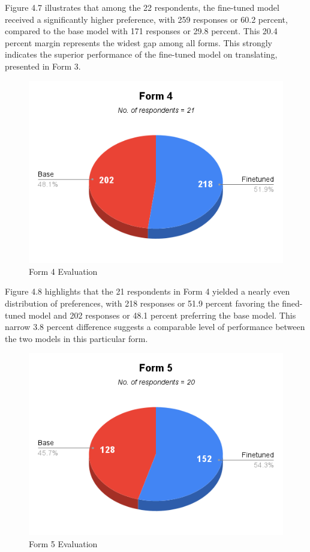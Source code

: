 Figure 4.7 illustrates that among the 22 respondents, the fine-tuned model received a significantly higher preference, with 259 responses or 60.2 percent, compared to the base model with 171 responses or 29.8 percent. This 20.4 percent margin represents the widest gap among all forms. This strongly indicates the superior performance of the fine-tuned model on translating, presented in Form 3. 

\begin{figure} [H]
	\centering
	\includegraphics[scale=0.7]{figures/Form4.png}
	\caption{Form 4 Evaluation}
\end{figure}

Figure 4.8 highlights that the 21 respondents in Form 4 yielded a nearly even distribution of preferences, with 218 responses or 51.9 percent favoring the fined-tuned model and 202 responses or 48.1 percent preferring the base model. This narrow 3.8 percent difference suggests a comparable level of performance between the two models in this particular form. 

\begin{figure}[H]
	\centering
	\includegraphics[scale=0.7]{figures/Form5.png}
	\caption{Form 5 Evaluation}
\end{figure}

